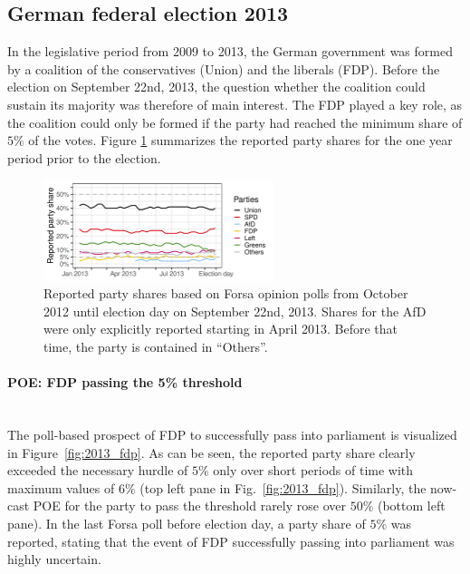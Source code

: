 \documentclass[smallcondensed]{svjour3_edited}     %
\begin{document}
\subsection{German federal election 2013} \label{subsec:2013}
In the legislative period from 2009 to 2013, the German government was formed by
a coalition of the conservatives (Union) and the liberals (FDP). Before the
election on September 22nd, 2013, the question whether the coalition could
sustain its majority was therefore of main interest. The FDP played a key role,
as the coalition could only be formed if the party had reached the minimum share
of $5\%$ of the votes. Figure \ref{fig:2013} summarizes the reported party shares
for the one year period prior to the election.

\begin{figure}[H]\centering
\includegraphics[width=0.6\textwidth]{fig_2013_forsa_rawShares.pdf}
\caption{Reported party shares based on Forsa opinion polls 
from October 2012 until election day on September 22nd, 2013.
Shares for the AfD were only explicitly reported starting in April 2013.
Before that time, the party is contained in ``Others''.
\label{fig:2013}
}
\end{figure}


\paragraph{POE: FDP passing the 5\% threshold} \ \\

The poll-based prospect of FDP to successfully pass into parliament is visualized
in Figure~\ref{fig:2013_fdp}.
As can be seen, the reported party share clearly exceeded the necessary hurdle
of $5\%$ only over short periods of time with maximum values
of $6\%$ (top left pane in Fig.~\ref{fig:2013_fdp}). Similarly, the now-cast POE
for the party to pass the threshold rarely rose over $50\%$ (bottom left pane).
In the last Forsa poll before election day, a party share of $5\%$ was reported,
stating that the event of FDP successfully passing into parliament was highly uncertain.\\
\end{document}
